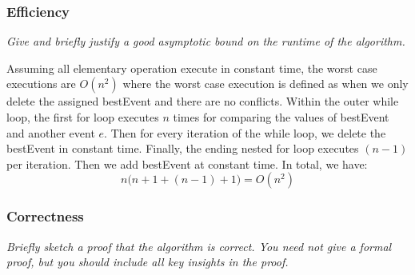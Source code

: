 \documentclass[11pt, oneside]{article}   	%
\theoremstyle{definition}
\theoremstyle{remark}
\begin{document}
\subsubsection{Efficiency}

\textit{Give and briefly justify a good asymptotic bound on the runtime of the algorithm.}

Assuming all elementary operation execute in constant time, the worst case executions are $O(n^2)$ where the worst case execution is defined as when we only delete the assigned bestEvent and there are no conflicts.  Within the outer while loop, the first for loop executes $n$ times for comparing the values of bestEvent and another event $e$. Then for every iteration of the while loop, we delete the bestEvent in constant time. Finally, the ending nested for loop executes $(n-1)$ per iteration. Then we add bestEvent at constant time. In total, we have: $$n\big(n+1+(n-1)+1\big) = O(n^2)$$
\subsubsection{Correctness}
\textit{Briefly sketch a proof that the algorithm is correct. You need not give a formal proof, but you should include all key insights in the
proof.}
\end{document}
